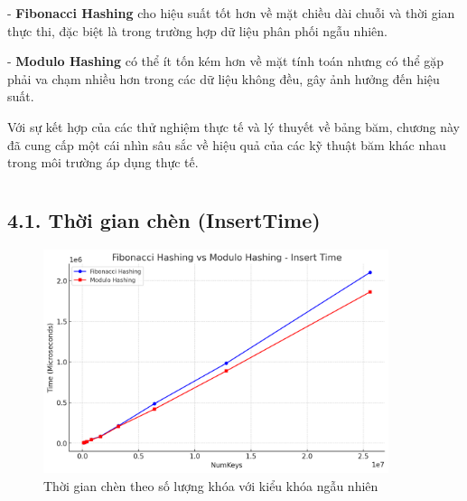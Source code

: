 \documentclass[12pt,a4paper]{report}
\begin{document}
    - \textbf{Fibonacci Hashing} cho hiệu suất tốt hơn về mặt chiều dài chuỗi và thời gian thực thi, đặc biệt là trong trường hợp dữ liệu phân phối ngẫu nhiên.
    
    - \textbf{Modulo Hashing} có thể ít tốn kém hơn về mặt tính toán nhưng có thể gặp phải va chạm nhiều hơn trong các dữ liệu không đều, gây ảnh hưởng đến hiệu suất.

Với sự kết hợp của các thử nghiệm thực tế và lý thuyết về bảng băm, chương này đã cung cấp một cái nhìn sâu sắc về hiệu quả của các kỹ thuật băm khác nhau trong môi trường áp dụng thực tế.

\newpage
\chapter*{}
\section*{4.1. Thời gian chèn (InsertTime)}
\begin{figure}[!ht]
    \centering
    \includegraphics[width=0.9\textwidth]{insert_random.png}
    \caption{Thời gian chèn theo số lượng khóa với kiểu khóa ngẫu nhiên}
    \label{fig:insert_random}
\end{figure}
\end{document}
